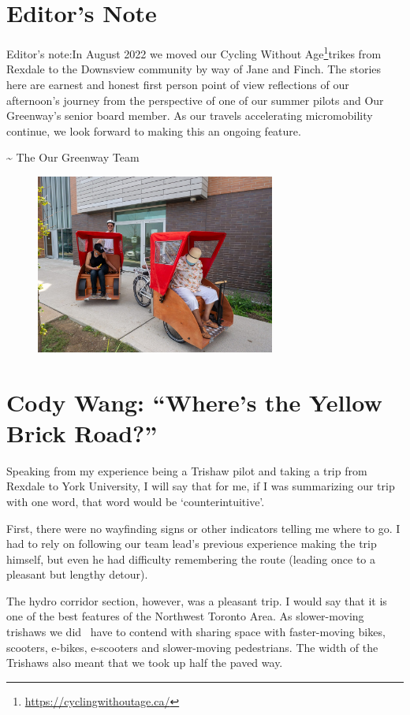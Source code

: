 \documentclass[letter]{ourGreenwayBrand}
\begin{document}
\MakeBrandTitle

\section{Editor's Note}
Editor’s note:In August 2022 we moved our Cycling Without Age\footnote{\url{https://cyclingwithoutage.ca/}}trikes from Rexdale to the Downsview community by way of Jane and Finch. The stories here are earnest and honest first person point of view reflections of our afternoon’s journey from the perspective of one of our summer pilots and Our Greenway’s senior board member. As our travels accelerating micromobility continue, we look forward to making this an ongoing feature.

\textasciitilde{} The Our Greenway Team

\begin{figure}[htbp]
  \centering
  \includegraphics[width=0.7\textwidth]{images/1220468-2048x1538.jpg}
\end{figure}

\section{Cody Wang: “Where’s the Yellow Brick Road?”}
Speaking from my experience being a Trishaw pilot and taking a trip from Rexdale to York University, I will say that for me, if I was summarizing our trip with one word, that word would be ‘counterintuitive’.

First, there were no wayfinding signs or other indicators telling me where to go. I had to rely on following our team lead’s previous experience making the trip himself, but even he had difficulty remembering the route (leading once to a pleasant but lengthy detour).

The hydro corridor section, however, was a pleasant trip. I would say that it is one of the best features of the Northwest Toronto Area. As slower-moving trishaws we did  have to contend with sharing space with faster-moving bikes, scooters, e-bikes, e-scooters and slower-moving pedestrians. The width of the Trishaws also meant that we took up half the paved way.
\end{document}
